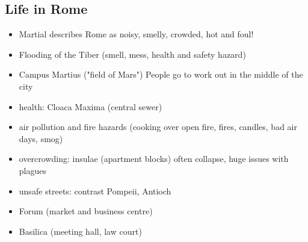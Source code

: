 \documentclass[12pt, twoside]{article}
\begin{document}
\subsection{Life in Rome}
\begin{itemize}
\item Martial describes Rome as noisy, smelly, crowded, hot and foul!
\item Flooding of the Tiber (smell, mess, health and safety hazard)
\item Campus Martius ("field of Mars") People go to work out in the middle of the city
\item health: Cloaca Maxima (central sewer)
\item air pollution and fire hazards (cooking over open fire, fires, candles, bad air days, smog)
\item overcrowding: insulae (apartment blocks) often collapse, huge issues with plagues
\item unsafe streets: contrast Pompeii, Antioch
\item Forum (market and business centre)
\item Basilica (meeting hall, law court)
\end{itemize}
\end{document}
